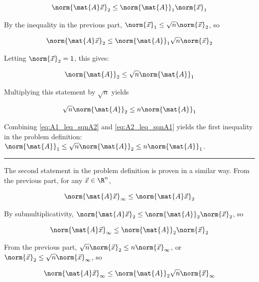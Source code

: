 \documentclass{template}
\begin{document}
\begin{equation}
    \norm{\mat{A}\vec{x}}_2 \leq \norm{\mat{A}}_1\norm{\vec{x}}_1
\end{equation}

By the inequality in the previous part, $\norm{\vec{x}}_1 \leq \sqrt{n}\norm{\vec{x}}_2$, so 

\begin{equation}
    \norm{\mat{A}\vec{x}}_2 \leq \norm{\mat{A}}_1\sqrt{n}\norm{\vec{x}}_2
\end{equation}

Letting $\norm{\vec{x}}_2 = 1$, this gives:

\begin{equation}
    \norm{\mat{A}}_2 \leq \sqrt{n}\norm{\mat{A}}_1
\end{equation}

Multiplying this statement by $\sqrt{n}$ yields

\begin{equation}\label{eq:A2_leq_sqnA1}
    \sqrt{n}\norm{\mat{A}}_2 \leq n\norm{\mat{A}}_1
\end{equation}

Combining \autoref{eq:A1_leq_sqnA2} and \autoref{eq:A2_leq_sqnA1} yields the first inequality in the problem definition: $ \norm{\mat{A}}_1 \leq \sqrt{n} \norm{\mat{A}}_2 \leq n \norm{\mat{A}}_1$. 

\hrule

The second statement in the problem definition is proven in a similar way. From the previous part, for any $\vec{x} \in \R^n$,

\begin{equation}
    \norm{\mat{A}\vec{x}}_\infty \leq \norm{\mat{A}\vec{x}}_2
\end{equation}

By submultiplicativity, $\norm{\mat{A}\vec{x}}_2 \leq \norm{\mat{A}}_2\norm{\vec{x}}_2$, so 

\begin{equation}
    \norm{\mat{A}\vec{x}}_\infty \leq \norm{\mat{A}}_2\norm{\vec{x}}_2
\end{equation}

From the previous part, $\sqrt{n}\norm{\vec{x}}_2 \leq n\norm{\vec{x}}_\infty$, or $\norm{\vec{x}}_2 \leq \sqrt{n}\norm{\vec{x}}_\infty$, so

\begin{equation}
    \norm{\mat{A}\vec{x}}_\infty \leq \norm{\mat{A}}_2\sqrt{n}\norm{\vec{x}}_\infty
\end{equation}
\end{document}
